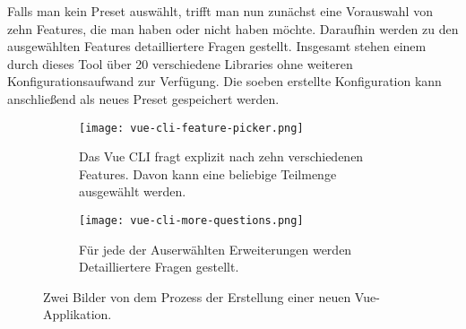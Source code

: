 Falls man kein Preset auswählt, trifft man nun zunächst eine Vorauswahl von zehn Features, die man haben oder nicht haben möchte. Daraufhin werden zu den ausgewählten Features detailliertere Fragen gestellt. Insgesamt stehen einem durch dieses Tool über 20 verschiedene Libraries ohne weiteren Konfigurationsaufwand zur Verfügung. Die soeben erstellte Konfiguration kann anschließend als neues Preset gespeichert werden.

  \begin{figure}
		\centering
		\begin{subfigure}[a]{0.4\linewidth}
			\texttt{[image: vue-cli-feature-picker.png]}
      		\caption{Das Vue CLI fragt explizit nach zehn verschiedenen Features. Davon kann eine beliebige Teilmenge ausgewählt werden.}
		\end{subfigure}
		\begin{subfigure}[a]{0.4\linewidth}
			\texttt{[image: vue-cli-more-questions.png]}
      		\caption{Für jede der Auserwählten Erweiterungen werden Detailliertere Fragen gestellt.}
		\end{subfigure}
		\caption{Zwei Bilder von dem Prozess der Erstellung einer neuen Vue-Applikation.}
		\label{fig:basics:vue_cli_example}
  \end{figure}



